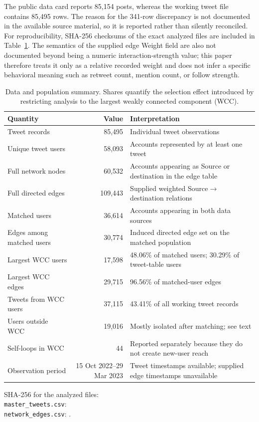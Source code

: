 \documentclass[11pt,a4paper]{article}
\begin{document}
The public data card reports 85,154 posts, whereas the working tweet file contains 85,495 rows. The reason for the 341-row discrepancy is not documented in the available source material, so it is reported rather than silently reconciled. For reproducibility, SHA-256 checksums of the exact analyzed files are included in Table~\ref{tab:dataaudit}. The semantics of the supplied edge Weight field are also not documented beyond being a numeric interaction-strength value; this paper therefore treats it only as a relative recorded weight and does not infer a specific behavioral meaning such as retweet count, mention count, or follow strength.

\begin{table}[H]
\centering
\small
\caption{Data and population summary. Shares quantify the selection effect introduced by restricting analysis to the largest weakly connected component (WCC).}
\label{tab:dataaudit}
\begin{tabularx}{0.98\textwidth}{@{}l r X@{}}
\toprule
Quantity & Value & Interpretation\\
\midrule
Tweet records & 85,495 & Individual tweet observations\\
Unique tweet users & 58,093 & Accounts represented by at least one tweet\\
Full network nodes & 60,532 & Accounts appearing as Source or destination in the edge table\\
Full directed edges & 109,443 & Supplied weighted Source$\rightarrow$destination relations\\
Matched users & 36,614 & Accounts appearing in both data sources\\
Edges among matched users & 30,774 & Induced directed edge set on the matched population\\
Largest WCC users & 17,598 & 48.06\% of matched users; 30.29\% of tweet-table users\\
Largest WCC edges & 29,715 & 96.56\% of matched-user edges\\
Tweets from WCC users & 37,115 & 43.41\% of all working tweet records\\
Users outside WCC & 19,016 & Mostly isolated after matching; see text\\
Self-loops in WCC & 44 & Reported separately because they do not create new-user reach\\
Observation period & 15 Oct 2022--29 Mar 2023 & Tweet timestamps available; supplied edge timestamps unavailable\\
\bottomrule
\end{tabularx}
\vspace{2mm}
\begin{minipage}{0.96\textwidth}\footnotesize
SHA-256 for the analyzed files:\\ \texttt{master\_tweets.csv}: \\
\texttt{network\_edges.csv}: .
\end{minipage}
\end{table}
\end{document}
